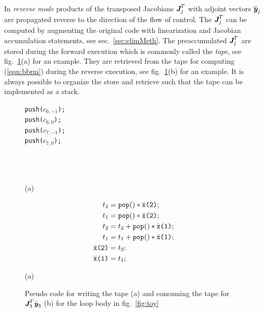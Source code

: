 \documentclass{book}
\newcommand{\bmJ}{\mbox{\bf\em J}}
\newcommand{\bmy}{\mbox{\bf\em y}}
\newcommand{\refsec}[1]{{sec.~\ref{#1}}}
\newcommand{\reffig}[1]{{fig.~\ref{#1}}}
\newcommand{\refeqn}[1]{{(\ref{#1})}}
\begin{document}
In {\em reverse mode} products of the transposed
Jacobians $\bmJ^T_j$ with adjoint vectors $\overline{\bmy}_j$
are propagated reverse to the direction of the flow of control.
The $\bmJ^T_j$ can be computed by augmenting the original code with 
linearization and Jacobian accumulation statements, see \refsec{sec:elimMeth}.
The preaccumulated  $\bmJ^T_j$ are stored during the forward execution
which is commonly called the {\em tape}, see \reffig{fig:toyPreaccRev}(a) for an 
example. They are retrieved from the 
tape for computing \refeqn{eqn:bbrm} during the reverse execution, see \reffig{fig:toyPreaccRev}(b) for 
an example. 
It is always possible to organize the store and retrieve such that the tape can be 
implemented as a stack.
\begin{figure}[h]
  \begin{center}
    \begin{minipage}[b]{.2\linewidth}
      \lstinline{push(}$c_{6,-1}$\lstinline{);}\\
      \lstinline{push(}$c_{6,0}$\lstinline{);}\\
      \lstinline{push(}$c_{7,-1}$\lstinline{);}\\
      \lstinline{push(}$c_{7,0}$\lstinline{);}\\
      \\ \\ \\
      \centerline{(a)}
    \end{minipage}
    \begin{minipage}[b]{.2\linewidth}
      \small
      \begin{align*}
        t_2&={\tt pop()}*\bar{\tt x}\mbox{\tt (2)};\\
        t_1&={\tt pop()}*\bar{\tt x}\mbox{\tt (2)};\\
        t_2&=t_2+{\tt pop()}*\bar{\tt x}\mbox{\tt (1)};\\
        t_1&=t_1+{\tt pop()}*\bar{\tt x}\mbox{\tt (1)};\\
        \bar{\tt x}\mbox{\tt (2)}& =t_2;\\
        \bar{\tt x}\mbox{\tt (1)}& =t_1;
      \end{align*}
      \centerline{(a)}
    \end{minipage}
  \end{center}	
  \caption{Pseudo code for writing the tape (a) and consuming the tape for  $\bmJ_3^T\bar{\bmy}_3$ (b) for  the loop body in \reffig{fig:toy}}\label{fig:toyPreaccRev}
\end{figure}
\end{document}
